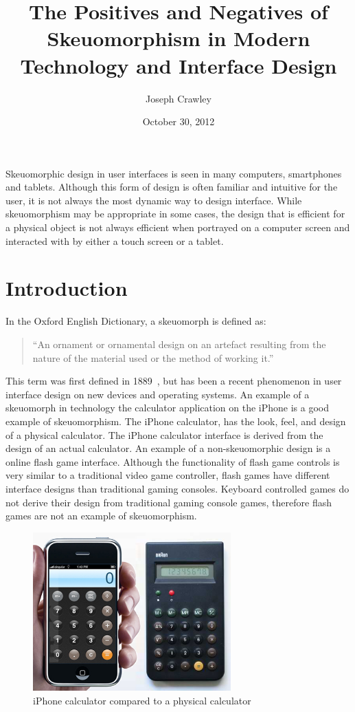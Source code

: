 \documentclass{article}
\title{The Positives and Negatives of Skeuomorphism in Modern Technology and Interface Design}
\author{Joseph Crawley}
\date{October 30, 2012}
\begin{document}
\maketitle

\abstract{}
Skeuomorphic design in user interfaces is seen in many computers, smartphones and tablets. Although this form of design is often familiar and intuitive for the user, it is not always the most dynamic way to design interface. While skeuomorphism may be appropriate in some cases, the design that is efficient for a physical object is not always efficient when portrayed on a computer screen and interacted with by either a touch screen or a tablet. 


\pagebreak
\tableofcontents


\listoffigures


\listoftables

\pagebreak

%
%
\section{Introduction}
\label{introduction}

In the Oxford English Dictionary, a skeuomorph is defined as: 
\begin{quote}“An ornament or ornamental design on an artefact resulting from the nature of the material used or the method of working it.” 
\end {quote}This term was first defined in 1889~\cite{oed}, but has been a recent phenomenon in user interface design on new devices and operating systems. An example of a skeuomorph in technology the calculator application on the iPhone is a good example of skeuomorphism. The iPhone calculator, has the look, feel, and design of a physical calculator. The iPhone calculator interface is derived from the design of an actual calculator. An example of a non-skeuomorphic design is a online flash game interface. Although the functionality of flash game controls is very similar to a traditional video game controller, flash games have different interface designs than traditional gaming consoles. Keyboard controlled games do not derive their design from traditional gaming console games, therefore flash games are not an example of skeuomorphism.
\begin{figure}
\centering
\includegraphics[width=3in]{calculator.jpeg} 

\caption{iPhone calculator compared to a physical calculator}
\label{calc}
\end{figure}
\end{document}
